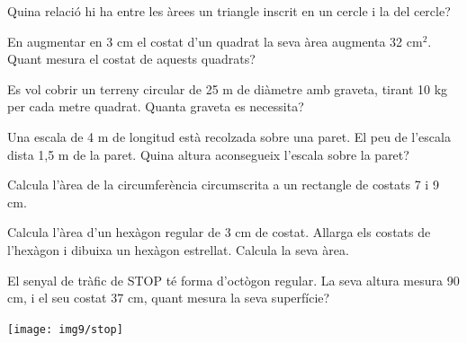 \begin{activitats}
\begin{mylist}
\exer \hot Quina relació hi ha entre les àrees un triangle inscrit en un cercle i la del cercle?

\exer  En augmentar en 3 cm el costat d'un quadrat la seva àrea augmenta 32 cm${}^{2}$. Quant mesura el costat de aquests quadrats?

\exer  Es vol cobrir un terreny circular de 25 m de diàmetre amb graveta, tirant 10 kg per cada metre quadrat. Quanta graveta es necessita?

\exer  Una escala de 4 m de longitud està recolzada sobre una paret. El peu de l'escala dista 1,5 m de la paret. Quina altura aconsegueix l'escala sobre la paret?

\exer  Calcula l'àrea de la circumferència circumscrita a un rectangle de costats 7 i 9 cm.

\exer  Calcula l'àrea d'un hexàgon regular de 3 cm de costat. Allarga els costats de l'hexàgon i dibuixa un hexàgon estrellat. Calcula la seva àrea.

\vspace{-1.5cm}
\exer \begin{minipage}[t]{0.3\textwidth}
	 El senyal de tràfic de STOP té forma d'octògon regular. La seva altura mesura 90 cm, i el seu costat 37 cm, quant mesura la seva superfície?
\end{minipage}
\begin{minipage}{0.15\textwidth}
	\centering
	\vspace{1.5cm}
	\texttt{[image: img9/stop]}
\end{minipage}


\end{mylist}
\end{activitats}
